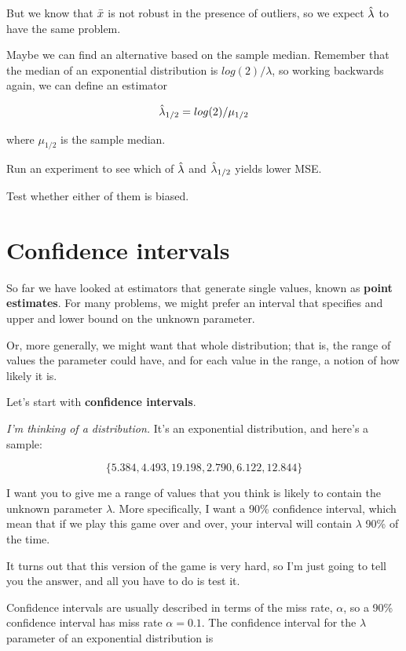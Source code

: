 \documentclass[12pt]{book}
\begin{document}
But we know that $\bar{x}$ is not robust in the presence of outliers, so
we expect $\hat{\lambda}$ to have the same problem.

Maybe we can find an alternative based on the sample median.  Remember
that the median of an exponential distribution is $log(2) / \lambda$,
so working backwards again, we can define an estimator

\[ \hat{\lambda}_{1/2} = log(2) / \mu_{1/2} \]

where $\mu_{1/2}$ is the sample median.

\begin{ex}

Run an experiment to see which of $\hat{\lambda}$ and $\hat{\lambda}_{1/2}$ yields
lower MSE.

Test whether either of them is biased.

\end{ex}


\section{Confidence intervals}

So far we have looked at estimators that generate single values, known
as {\bf point estimates}.  For many problems, we might prefer an interval
that specifies and upper and lower bound on the unknown parameter.

Or, more generally, we might want that whole distribution; that is,
the range of values the parameter could have, and for each value in
the range, a notion of how likely it is.

Let's start with {\bf confidence intervals}.

{\em I'm thinking of a distribution.}  It's an exponential distribution, and 
here's a sample:

\[ \{ 5.384, 4.493, 19.198, 2.790, 6.122, 12.844 \} \]

I want you to give me a range of values that you think is likely to
contain the unknown parameter $\lambda$.  More specifically, I want
a 90\% confidence interval, which mean that if we play this game over
and over, your interval will contain $\lambda$ 90\% of the time.

It turns out that this version of the game is very hard, so I'm just going
to tell you the answer, and all you have to do is test it.

Confidence intervals are usually described in terms of the miss rate,
$\alpha$, so a 90\% confidence interval has miss rate $\alpha = 0.1$.
The confidence interval for the $\lambda$ parameter of an exponential
distribution is
\end{document}

